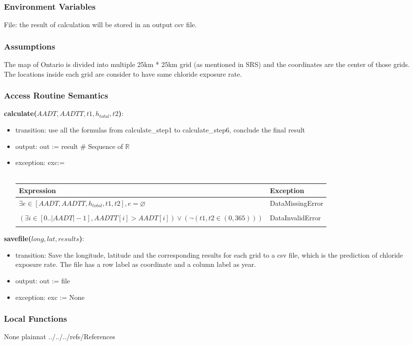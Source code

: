 \documentclass[12pt, titlepage]{article}
\begin{document}
\subsubsection{Environment Variables}
File: the result of calculation will be stored in an output csv file.
\subsubsection{Assumptions}
The map of Ontario is divided into multiple 25km * 25km grid (as mentioned in SRS) and the coordinates are the center of those grids. The locations inside each grid are consider to have same chloride exposure rate.

\subsubsection{Access Routine Semantics}

\noindent \textbf{calculate($AADT, AADTT, t1, h_{total}, t2$)}:
\begin{itemize}
\item transition: use all the formulas from calculate\_step1 to calculate\_step6, conclude the final result
\item output: out := result \# Sequence of $\mathbb{R}$
\item exception: exc:= \\ \\ 
 \begin{tabular}{p{10cm} p{3.5cm} }
 \hline
 \textbf{Expression} & \textbf{Exception}  \\
 \hline
     $\exists e \in [AADT, AADTT, h_{total}, t1, t2], e =\varnothing$ & DataMissingError  \\ \\

  \hline
     $(\exists i \in [0..|AADT|-1], AADTT[i] > AADT[i]) \lor (\neg (t1, t2 \in (0,365)))$   & DataInvalidError \\ \\

  \hline
 \end{tabular}

\end{itemize}


\noindent \textbf{savefile($long, lat, results$)}:
\begin{itemize}
\item transition: Save the longitude, latitude and the corresponding results for each grid to a csv file, which is the prediction of chloride exposure rate. The file has a row label as coordinate and a column label as year. 
\item output: out := file
\item exception: exc := None
\end{itemize}



\subsubsection{Local Functions}
None
 {plainnat}
 {../../../refs/References}

\newpage
\end{document}

